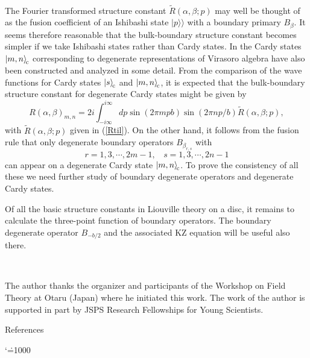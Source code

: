 \documentclass[a4paper,11pt]{article}
\newcommand{\cket}[1]{\left|{#1}\right>_{\rm \!c}}
\newcommand{\iket}[1]{|{#1}\rangle\!\rangle}
\begin{document}
~

   The Fourier transformed structure constant $\tilde{R}(\alpha,\beta;p)$
 may well be thought of as the fusion coefficient of an Ishibashi state
 $\iket{p}$ with a boundary primary $B_\beta$.
 It seems therefore reasonable that the bulk-boundary structure constant
 becomes simpler if we take Ishibashi states rather than Cardy states.
 In \cite{ZZ} the Cardy states $\cket{m,n}$ corresponding to degenerate
 representations of Virasoro algebra have also been constructed
 and analyzed in some detail.
 From the comparison of the wave functions for Cardy states
 $\cket{s}$ and $\cket{m,n}$, it is expected that the bulk-boundary
 structure constant for degenerate Cardy states might be given by
\begin{equation}
  R(\alpha,\beta)_{m,n} = 2i\int_{-i\infty}^{i\infty}dp
  \sin(2\pi mpb)\sin(2\pi np/b)\tilde{R}(\alpha,\beta;p),
\end{equation}
 with $\tilde{R}(\alpha,\beta;p)$ given in (\ref{Rtil}).
 On the other hand, it follows from the fusion rule that only
 degenerate boundary operators $B_{\beta_{r,s}}$ with
\[
 r=1,3,\cdots, 2m-1,~~~~ s=1,3,\cdots, 2n-1
\]
 can appear on a degenerate Cardy state $\cket{m,n}$.
 To prove the consistency of all these we need further study of
 boundary degenerate operators and degenerate Cardy states.

   Of all the basic structure constants in Liouville theory on a disc,
 it remains to calculate the three-point function of boundary operators.
   The boundary degenerate operator $B_{-b/2}$ and the associated
 KZ equation will be useful also there.

~

   The author thanks the organizer and participants of the Workshop
 on Field Theory at Otaru (Japan) where he initiated this work.
 The work of the author is supported in part by JSPS Research
 Fellowships for Young Scientists. 

\vskip15mm

\begin{center}{\sc References}\end{center}\par

     {\settowidth{}\leftmargin{}
      \advance\leftmargin{}}
\def\newblock{\hskip .11em plus .33em minus .07em}
\sloppy{}
\sfcode`\.=1000\relax
\let\endthebibliography=\endlist
\end{document}
